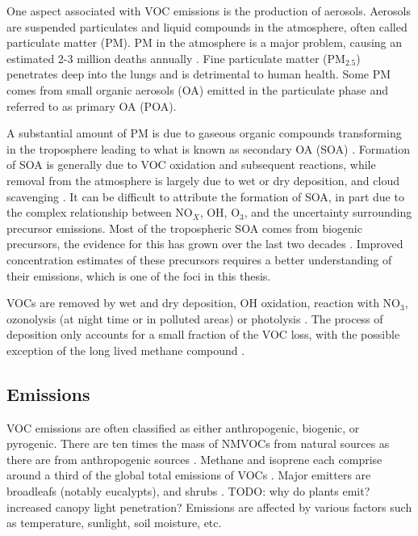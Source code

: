   One aspect associated with VOC emissions is the production of aerosols.
  Aerosols are suspended particulates and liquid compounds in the atmosphere, often called particulate matter (PM).
  PM in the atmosphere is a major problem, causing an estimated 2-3 million deaths annually \parencite{Hoek2013, Krewski2009, Silva2013, Lelieveld2015}. 
  Fine particulate matter (PM$_{2.5}$) penetrates deep into the lungs and is detrimental to human health.
  Some PM comes from small organic aerosols (OA) emitted in the particulate phase and referred to as primary OA (POA).
  
  A substantial amount of PM is due to gaseous organic compounds transforming in the troposphere leading to what is known as secondary OA (SOA) \parencite{Kroll2008}.
  Formation of SOA is generally due to VOC oxidation and subsequent reactions, while removal from the atmosphere is largely due to wet or dry deposition, and cloud scavenging \parencite{Kanakidou2005}.
  It can be difficult to attribute the formation of SOA, in part due to the complex relationship between NO$_X$, OH, O$_3$, and the uncertainty surrounding precursor emissions.
  Most of the tropospheric SOA comes from biogenic precursors, the evidence for this has grown over the last two decades \parencite{Guenther1995, Kanakidou2005,Guenther2012}.
  Improved concentration estimates of these precursors requires a better understanding of their emissions, which is one of the foci in this thesis.
  
  VOCs are removed by wet and dry deposition, OH oxidation, reaction with NO$_3$, ozonolysis (at night time or in polluted areas) or photolysis \parencite{AtkinsonArey2003, Brown2009}.
  The process of deposition only accounts for a small fraction of the VOC loss, with the possible exception of the long lived methane compound \parencite{AtkinsonArey2003}.
  
  
  \subsection{Emissions}
    \label{LR:VOCs:Emissions}
    
    VOC emissions are often classified as either anthropogenic, biogenic, or pyrogenic.
    There are ten times the mass of NMVOCs from natural sources as there are from anthropogenic sources \parencite{Guenther2006, Kanakidou2005, Millet2006}.
    Methane and isoprene each comprise around a third of the global total emissions of VOCs \parencite{Guenther2006}.
    Major emitters are broadleafs (notably eucalypts), and shrubs \parencite{Guenther2006, Arneth2008, Niinemets2010, Monks2015}.
    TODO: why do plants emit? increased canopy light penetration?
    Emissions are affected by various factors such as temperature, sunlight, soil moisture, etc.
    
